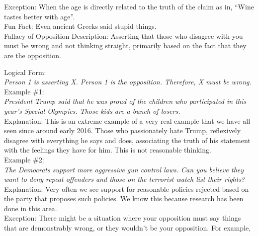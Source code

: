 \documentclass[a4paper,12pt,single,pdftex]{scrartcl}
\begin{document}
    
      Exception: When the age is directly related to the truth of the claim as in, “Wine tastes better with age”.
    \\

    
      Fun Fact: Even ancient Greeks said stupid things.
    \\

  

Fallacy of Opposition
    Description: Asserting that those who disagree with you must be wrong and not thinking straight, primarily based on the fact that they are the opposition.

    
      Logical Form:
    \\

    
      {\em Person 1 is asserting X. \newline
Person 1 is the opposition. \newline
Therefore, X must be wrong.}
    \\

    
      Example \#1:
    \\

    
      {\em President Trump said that he was proud of the children who participated in this year's Special Olympics. Those kids are a bunch of losers.}
    \\

    
      Explanation: This is an extreme example of a very real example that we have all seen since around early 2016. Those who passionately hate Trump, reflexively disagree with everything he says and does, associating the truth of his statement with the feelings they have for him. This is not reasonable thinking.
    \\

    
      Example \#2:
    \\

    
      {\em The Democrats support more aggressive gun control laws. Can you believe they want to deny repeat offenders and those on the terrorist watch list their rights?}
    \\

    
      Explanation: Very often we see support for reasonable policies rejected based on the party that proposes such policies. We know this because research has been done in this area.
    \\

    
      Exception: There might be a situation where your opposition must say things that are demonstrably wrong, or they wouldn’t be your opposition. For example,
    \\
\end{document}
